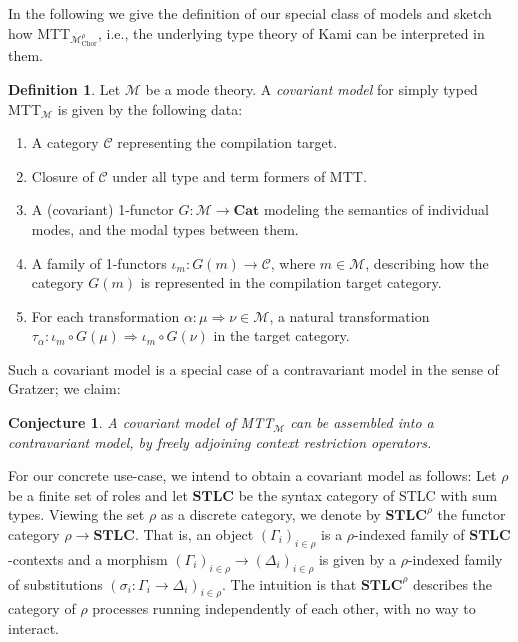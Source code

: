 \documentclass{scrartcl}
\theoremstyle{definition}
\newtheorem{definition}{Definition}
\theoremstyle{plain}
\newtheorem{conjecture}{Conjecture}
\begin{document}
In the following we give the definition of our special class of models and
sketch how MTT${}_{\mathcal{M}^\rho_{\textrm{Chor}}}$, i.e., the underlying
type theory of Kami can be interpreted in them.
\begin{definition}
  Let $\mathcal{M}$ be a mode theory. A \emph{covariant model} for
  simply typed MTT$_{\mathcal{M}}$ is given by the following data:
  \begin{enumerate}
  \item
    A category $\mathcal{C}$ representing the compilation target.
  \item
    Closure of $\mathcal{C}$ under all type and term formers of MTT.
  \item
    A (covariant) 1-functor $G : \mathcal{M} \to \textbf{Cat}$ modeling the
    semantics of individual modes, and the modal types between them.
  \item
    A family of 1-functors $\iota_m : G(m) \to \mathcal{C}$, where $m \in
    \mathcal{M}$, describing how the category $G(m)$ is represented in the
    compilation target category.
  \item
    For each transformation $\alpha : \mu \Rightarrow \nu \in \mathcal{M}$, a
    natural transformation $\tau_\alpha : \iota_m \circ G(\mu) \Rightarrow
    \iota_m \circ G(\nu)$ in the target category.
  \end{enumerate}
\end{definition}
Such a covariant model is a special case of a contravariant model in the sense
of Gratzer; we claim:
\begin{conjecture}
  A covariant model of MTT$_{\mathcal{M}}$ can be assembled into a
  contravariant model, by freely adjoining context restriction operators.
\end{conjecture}
For our concrete use-case, we intend to obtain a covariant model as follows:
Let $\rho$ be a finite set of roles and let $\textbf{STLC}$ be the syntax
category of STLC with sum types. Viewing the set $\rho$ as a discrete category,
we denote by $\textbf{STLC}^\rho$ the functor category $\rho \to
\textbf{STLC}$. That is, an object $(\Gamma_i)_{i\in\rho}$ is a $\rho$-indexed
family of $\textbf{STLC}$-contexts and a morphism $(\Gamma_i)_{i\in\rho} \to
(\Delta_i)_{i\in\rho}$ is given by a $\rho$-indexed family of substitutions
$(\sigma_i : \Gamma_i \to \Delta_i)_{i\in\rho}$. The intuition is that
$\textbf{STLC}^\rho$ describes the category of $\rho$ processes running
independently of each other, with no way to interact.
\end{document}
